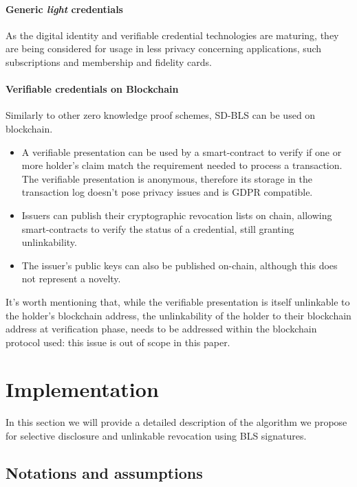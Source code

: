 \paragraph{Generic \textit{light} credentials}
As the digital identity and verifiable credential technologies are maturing, they are being considered for usage in less privacy concerning applications, such subscriptions and membership and fidelity cards.

\paragraph{Verifiable credentials on Blockchain}
Similarly to other zero knowledge proof schemes, SD-BLS can be used on blockchain.
\begin{itemize}
    \item A verifiable presentation can be used by a smart-contract to verify if one or more holder's claim match the requirement needed to process a transaction. The verifiable presentation is anonymous, therefore its storage in the transaction log doesn't pose privacy issues and is GDPR compatible.
    \item Issuers can publish their cryptographic revocation lists on chain, allowing smart-contracts to verify the status of a credential, still granting unlinkability.
    \item The issuer's public keys can also be published on-chain, although this does not represent a novelty.
\end{itemize}

It's worth mentioning that, while the verifiable presentation is itself unlinkable to the holder's blockchain address, the unlinkability of the holder to their blockchain address at verification phase, needs to be addressed within the blockchain protocol used: this issue is out of scope in this paper.

\section{Implementation}

In this section we will provide a detailed description of the algorithm we propose for selective disclosure and unlinkable revocation using BLS signatures.

\subsection{Notations and assumptions}

